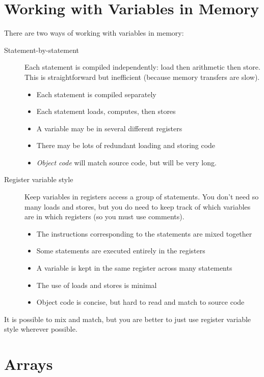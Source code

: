 \section{Working with Variables in Memory}\label{sec:working_with_variables_in_memory}

There are two ways of working with variables in memory:
\begin{description}
	\item[Statement-by-statement] Each statement is compiled independently: load then arithmetic then store. This is straightforward but inefficient (because memory transfers are slow).
		\begin{itemize}
			\item Each statement is compiled separately
			\item Each statement loads, computes, then stores
			\item A variable may be in several different registers
			\item There may be lots of redundant loading and storing code
			\item \emph{Object code} will match source code, but will be very long.
		\end{itemize}
	\item[Register variable style] Keep variables in registers access a group of statements. You don't need so many loads and stores, but you do need to keep track of which variables are in which registers (so you must use comments).
		\begin{itemize}
			\item The instructions corresponding to the statements are mixed together
			\item Some statements are executed entirely in the registers
			\item A variable is kept in the same register across many statements
			\item The use of loads and stores is minimal
			\item Object code is concise, but hard to read and match to source code
		\end{itemize}
\end{description}

\begin{note}
	It is possible to mix and match, but you are better to just use register variable style wherever possible.
\end{note}

\section{Arrays}\label{sec:arrays}

